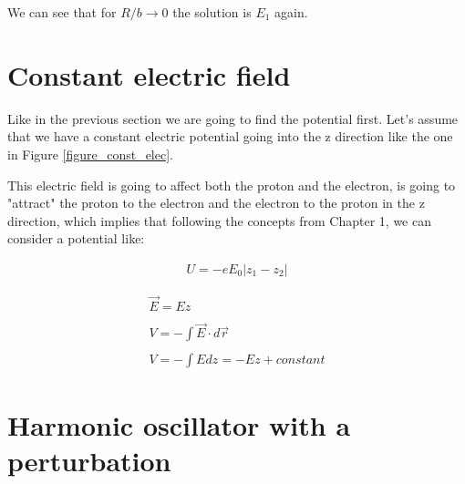 We can see that for $R/b \to 0$ the solution is $E_1$ again.



\section{Constant electric field}

Like in the previous section we are going to find the potential first. Let's assume that we have a constant electric potential going into the z direction like the one in Figure \ref{figure_const_elec}.

\begin{marginfigure}
  \label{figure_const_elec}
\end{marginfigure}

This electric field is going to affect both the proton and the electron, is going to "attract" the proton to the electron and the electron to the proton in the z direction, which implies that following the concepts from Chapter 1, we can consider a potential like:

\begin{equation}
  \begin{array}{c}
    U = -e E_0 |z_1-z_2|
  \end{array}
\end{equation}

\begin{equation}
  \begin{array}{c}
    \vec{E} = E \hat{z}
    \\

    \\
    V = - \int \vec{E} \cdot d\vec{r}
    \\

    \\
    V = - \int E dz = -Ez + constant
  \end{array}
\end{equation}

\section{Harmonic oscillator with a perturbation}
